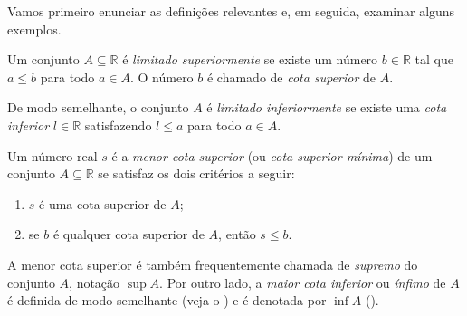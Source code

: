 Vamos primeiro enunciar as definições relevantes e, em seguida, examinar alguns exemplos.

\begin{definition}\label{def:cotas-superiores-inferiores}
Um conjunto $A \subseteq \mathbb{R}$ é \textit{limitado superiormente} se existe um número $b \in \mathbb{R}$ tal que $a \leq b$ para todo $a \in A$. O número $b$ é chamado de \textit{cota superior} de $A$.   

De modo semelhante, o conjunto $A$ é \textit{limitado inferiormente} se existe uma \textit{cota inferior} $l \in \mathbb{R}$ satisfazendo $l \leq a$ para todo $a \in A$.  
\end{definition}

\break 


\begin{definition}\label{def:menor-cota-superior}
Um número real $s$ é a \textit{menor cota superior} (ou \textit{cota superior mínima}) de um conjunto $A \subseteq \mathbb{R}$ se satisfaz os dois critérios a seguir:  
\begin{enumerate}[label=(\roman*)]
\item $s$ é uma cota superior de $A$;
\item se $b$ é qualquer cota superior de $A$, então $s \leq b$.
\end{enumerate}
\end{definition}

A menor cota superior é também frequentemente chamada de \textit{supremo} do conjunto $A$,
notação $\sup A$. Por outro lado, a \textit{maior cota inferior} ou \textit{ínfimo} de $A$ é definida de modo semelhante (veja o ) e é denotada por $\inf A$ ().  


